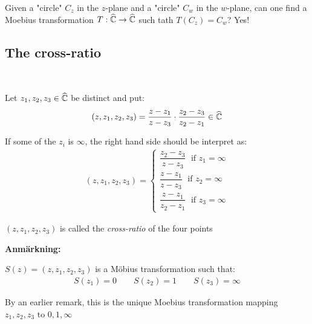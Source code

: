 \par\bigskip
\noindent Given a "circle" $C_z$ in the $z$-plane and a "circle" $C_w$ in the $w$-plane, can one find a Moebius transformation $T:\widehat{\mathbb{C}}\to\widehat{\mathbb{C}}$  such tath $T(C_z) = C_w$? Yes!
\newpage
\subsection{The cross-ratio}\hfill\\
\par\bigskip
\begin{theo}{}
  Let $z_1,z_2,z_3\in\widehat{\mathbb{C}}$ be distinct and put:
  \begin{equation*}
    \begin{gathered}
      (z,z_1,z_2,z_3) = \dfrac{z-z_1}{z-z_3}\cdot\dfrac{z_2-z_3}{z_2-z_1}\in\widehat{\mathbb{C}}
    \end{gathered}
  \end{equation*}
  \par\bigskip
  \noindent If some of the $z_i$ is $\infty$, the right hand side should be interpret as:
  \begin{equation*}
    \begin{gathered}
      (z,z_1,z_2,z_3)= 
      \begin{cases}
        \dfrac{z_2-z_3}{z-z_3}\;\text{ if } z_1=\infty\\
        \dfrac{z-z_1}{z-z_3}\;\text{ if } z_2=\infty\\
        \dfrac{z-z_1}{z_2-z_1}\;\text{ if } z_3 = \infty
      \end{cases}
    \end{gathered}
  \end{equation*}
  \par\bigskip
  \noindent $(z,z_1,z_2,z_3)$ is called the \textit{cross-ratio} of the four points 
\end{theo}
\par\bigskip
\noindent\textbf{Anmärkning:}\par
\noindent $S(z) = (z,z_1,z_2,z_3)$ is a Möbius transformation such that:
\begin{equation*}
  \begin{gathered}
    S(z_1) = 0\qquad S(z_2) =1\qquad S(z_3) = \infty
  \end{gathered}
\end{equation*}\par
\noindent By an earlier remark, this is the unique Moebius transformation mapping $z_1,z_2,z_3$  to $0,1,\infty$
\par\bigskip
